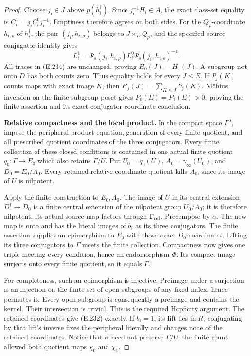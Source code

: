 \begin{proof}
Choose $j_i\in J$ above $p(h_i^\dagger)$.
Since $j_i^{-1}H_i\in A$, the exact class-set equality is
$C_i^1=j_iC_i^0j_i^{-1}$.
Emptiness therefore agrees on both sides.
For the $Q_\rho$-coordinate $h_{i,\rho}$ of
$h_i^\dagger$, the pair $(j_i,h_{i,\rho})$ belongs
to $J\times_DQ_\rho$, and the specified source
conjugator identity gives
\[
 L_i^1=\Psi_\rho(j_i,h_{i,\rho})
           L_i^0\Psi_\rho(j_i,h_{i,\rho})^{-1}.
\]
All traces in (E.234) are unchanged, proving
$H_0(J)=H_1(J)$. A subgroup not onto $D$ has
both counts zero. Thus equality holds for every
$J\leq E$. If $P_j(K)$ counts maps with exact
image $K$, then $H_j(J)=\sum_{K\leq J}P_j(K)$.
M\"obius inversion on the finite subgroup poset
gives $P_0(E)=P_1(E)>0$, proving the finite assertion
and its exact conjugator-coordinate conclusion.

\medskip\noindent\textbf{Relative compactness and the local product.}
In the compact space $\Gamma^3$, impose the
peripheral product equation, generation of every
finite quotient, and all prescribed quotient
coordinates of the three conjugators. Every finite
collection of these closed conditions is contained
in one actual finite quotient $q_0:\Gamma\to E_0$
which also retains $\Gamma/U$.
Put $U_0=q_0(U)$, $A_0=\gamma_\infty(U_0)$, and
$D_0=E_0/A_0$.
Every retained relative-coordinate quotient kills
$A_0$, since its image of $U$ is nilpotent.

Apply the finite construction to $E_0,A_0$.
The image of $U$ in its central extension
$D^\dagger\to D_0$ is a finite central extension
of the nilpotent group $U_0/A_0$; it is therefore
nilpotent. Its actual source map factors through
$\Gamma_{\rm rel}$. Precompose by $\alpha$.
The new map is onto and has the literal images
of $b_i$ as its three conjugators. The finite
assertion supplies an epimorphism to $E_0$ with
those exact $D_0$-coordinates. Lifting its three
conjugators to $\Gamma$ meets the finite collection.
Compactness now gives one triple meeting every
condition, hence an endomorphism $\Phi$.
Its compact image surjects onto every finite
quotient, so it equals $\Gamma$.

For completeness, such an epimorphism is injective.
Preimage under a surjection is an injection on
the finite set of open subgroups of any fixed
index, hence permutes it. Every open subgroup
is consequently a preimage and contains the
kernel. Their intersection is trivial.
This is the required Hopficity argument.
The retained coordinates give (E.232) exactly.
If $b_i=1$, its lift lies in $R$; conjugating
by that lift's inverse fixes the peripheral
literally and changes none of the retained
coordinates. Notice that $\alpha$ need not
preserve $\Gamma/U$: the finite count allowed
both quotient maps $\chi_0$ and $\chi_1$.


\end{proof}
